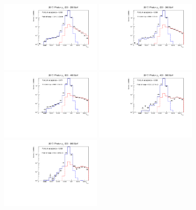 \begin{figure}[htbp]
    \centering
    \includegraphics[width=0.45\textwidth]{fig/purity/fit_2017_pt200-250.pdf}
    \includegraphics[width=0.45\textwidth]{fig/purity/fit_2017_pt250-300.pdf}
    \includegraphics[width=0.45\textwidth]{fig/purity/fit_2017_pt300-400.pdf}
    \includegraphics[width=0.45\textwidth]{fig/purity/fit_2017_pt400-500.pdf}
    \includegraphics[width=0.45\textwidth]{fig/purity/fit_2017_pt500-600.pdf}

\end{figure}
